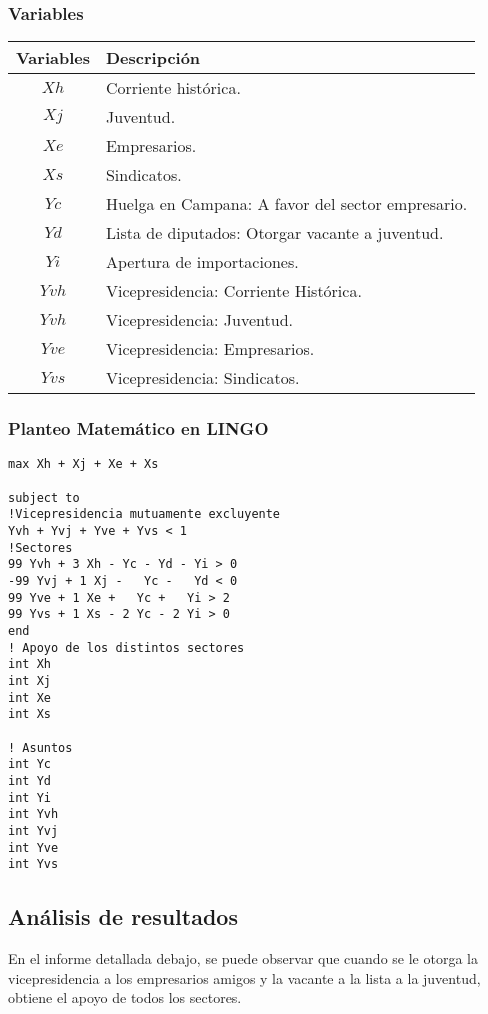 \documentclass[10pt, a4paper, titlepage,
	oneside,
	fleqn, leqno]{article}
\begin{document}
\subsubsection{Variables}

\begin{table}[h!t]
  \centering
  \begin{tabular}{ | c | p{7cm} | }
    \hline
    \textbf{Variables} & \textbf{Descripción} \\ \hline
     \(Xh\)          &  Corriente histórica. \\ \hline
     \(Xj\)          & Juventud. \\ \hline
     \(Xe\)          & Empresarios. \\ \hline
     \(Xs\)          & Sindicatos. \\ \hline
     \(Yc\)          & Huelga en Campana: A favor del sector empresario. \\ \hline
     \(Yd\)          & Lista de diputados: Otorgar vacante a juventud. \\ \hline
     \(Yi\)          & Apertura de importaciones. \\ \hline
     \(Yvh\)          & Vicepresidencia: Corriente Histórica. \\ \hline
     \(Yvh\)          & Vicepresidencia: Juventud. \\ \hline
     \(Yve\)          & Vicepresidencia: Empresarios. \\ \hline
     \(Yvs\)          & Vicepresidencia: Sindicatos. \\ \hline
  \end{tabular}

\end{table}

\subsubsection{Planteo Matemático en LINGO}
\begin{lstlisting}
max Xh + Xj + Xe + Xs

subject to
!Vicepresidencia mutuamente excluyente
Yvh + Yvj + Yve + Yvs < 1
!Sectores
99 Yvh + 3 Xh - Yc - Yd - Yi > 0
-99 Yvj + 1 Xj -   Yc -   Yd < 0 
99 Yve + 1 Xe +   Yc +   Yi > 2  
99 Yvs + 1 Xs - 2 Yc - 2 Yi > 0  
end
! Apoyo de los distintos sectores
int Xh 
int Xj 
int Xe 
int Xs

! Asuntos
int Yc  
int Yd  
int Yi  
int Yvh 
int Yvj 
int Yve 
int Yvs 
\end{lstlisting}
\subsection{Análisis de resultados}
En el informe detallada debajo, se puede observar que  cuando se le otorga la vicepresidencia a los empresarios amigos y la vacante a la lista a la juventud, obtiene el apoyo de todos los sectores.
\end{document}
